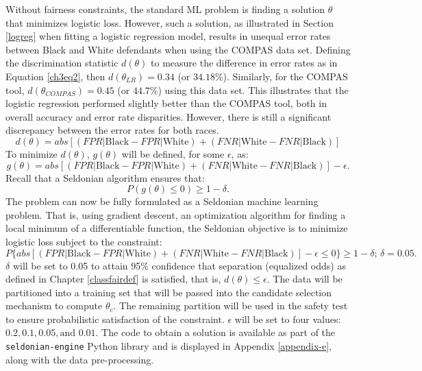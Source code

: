 \documentclass[12pt, twoside]{amherstthesis}
\begin{document}
Without fairness constraints, the standard ML problem is finding a solution \(\theta\) that minimizes logistic loss. However, such a solution, as illustrated in Section \ref{logreg} when fitting a logistic regression model, results in unequal error rates between Black and White defendants when using the COMPAS data set. Defining the discrimination statistic \(d(\theta)\) to measure the difference in error rates as in Equation \ref{ch3eq2}, then \(d(\theta_{LR}) = 0.34\) (or \(34.18\)\%). Similarly, for the COMPAS tool, \(d(\theta_{COMPAS}) = 0.45\) (or \(44.7\)\%) using this data set. This illustrates that the logistic regression performed slightly better than the COMPAS tool, both in overall accuracy and error rate disparities. However, there is still a significant discrepancy between the error rates for both races.
\begin{equation}
\label{ch3eq2}
d(\theta) = abs[(FPR | \text{Black} - FPR | \text{White}) + (FNR | \text{White} - FNR | \text{Black})]
\end{equation}
\noindent To minimize \(d(\theta)\), \(g(\theta)\) will be defined, for some \(\epsilon\), as:
\begin{equation}
\label{ch3eq3}
g(\theta) = abs[(FPR | \text{Black} - FPR | \text{White}) + (FNR | \text{White} - FNR | \text{Black})] - \epsilon.
\end{equation}
\noindent Recall that a Seldonian algorithm ensures that:
\begin{equation}
\label{ch3eq4}
P(g(\theta) \leq 0) \geq 1 - \delta.
\end{equation}
\noindent The problem can now be fully formulated as a Seldonian machine learning problem. That is, using gradient descent, an optimization algorithm for finding a local minimum of a differentiable function, the Seldonian objective is to minimize logistic loss subject to the constraint:
\begin{equation}
\label{ch3eq5}
P\{abs[(FPR | \text{Black} - FPR | \text{White}) + (FNR | \text{White} - FNR | \text{Black})]  - \epsilon \leq 0 \} \geq 1 - \delta \textit{; } \delta = 0.05.
\end{equation}
\(\delta\) will be set to 0.05 to attain 95\% confidence that separation (equalized odds) as defined in Chapter \ref{classfairdef} is satisfied, that is, \(d(\theta) \leq \epsilon\). The data will be partitioned into a training set that will be passed into the candidate selection mechanism to compute \(\theta_c\). The remaining partition will be used in the safety test to ensure probabilistic satisfaction of the constraint. \(\epsilon\) will be set to four values: \(0.2, 0.1, 0.05, \text{and } 0.01\). The code to obtain a solution is available as part of the \texttt{seldonian-engine} Python library and is displayed in Appendix \ref{appendix-e}, along with the data pre-processing.
\end{document}
